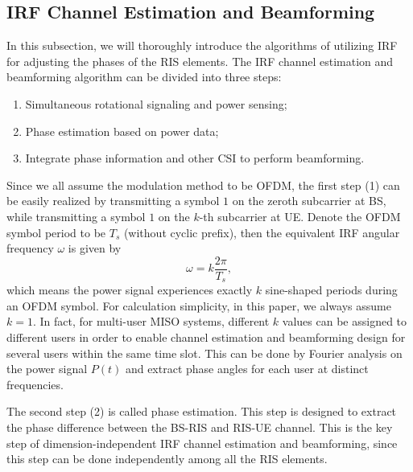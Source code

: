 \documentclass[12pt,draftclsnofoot,journal,onecolumn]{IEEEtran}
\theoremstyle{nonumberplain}
\begin{document}
\subsection{IRF Channel Estimation and Beamforming} \label{IRF Channel Estimation and Beamforming}
    In this subsection, we will thoroughly introduce the algorithms of utilizing \ac{IRF} for adjusting the phases of the RIS elements. The \ac{IRF} channel estimation and beamforming algorithm can be divided into three steps:
    \begin{enumerate}
        \item Simultaneous rotational signaling and power sensing; 
        \item Phase estimation based on power data;
        \item Integrate phase information and other CSI to perform beamforming. 
    \end{enumerate} 
    Since we all assume the modulation method to be OFDM, the first step (1) can be easily realized by transmitting a symbol $1$ on the zeroth subcarrier at BS, while transmitting a symbol $1$ on the $k$-th subcarrier at UE. Denote the OFDM symbol period to be $T_s$ (without cyclic prefix), then the equivalent IRF angular frequency $\omega$ is given by 
    \begin{equation}
        \omega = k \frac{2\pi}{T_s},
    \end{equation}
    which means the power signal experiences exactly $k$ sine-shaped periods during an OFDM symbol. For calculation simplicity, in this paper, we always assume $k=1$. In fact, for multi-user MISO systems, different $k$ values can be assigned to different users in order to enable channel estimation and beamforming design for several users within the same time slot. This can be done by Fourier analysis on the power signal $P(t)$ and extract phase angles for each user at distinct frequencies. 

    The second step (2) is called phase estimation. This step is designed to extract the phase difference between the BS-RIS and RIS-UE channel. This is the key step of dimension-independent IRF channel estimation and beamforming, since this step can be done independently among all the RIS elements. 
\end{document}
